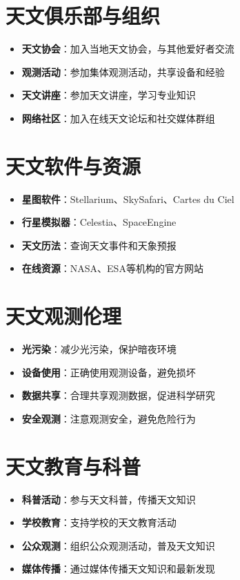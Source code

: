 \documentclass[12pt,UTF8]{ctexbook}
\begin{document}
\section{天文俱乐部与组织}

\begin{itemize}
  \item \textbf{天文协会}：加入当地天文协会，与其他爱好者交流
  \item \textbf{观测活动}：参加集体观测活动，共享设备和经验
  \item \textbf{天文讲座}：参加天文讲座，学习专业知识
  \item \textbf{网络社区}：加入在线天文论坛和社交媒体群组
\end{itemize}

\section{天文软件与资源}

\begin{itemize}
  \item \textbf{星图软件}：Stellarium、SkySafari、Cartes du Ciel
  \item \textbf{行星模拟器}：Celestia、SpaceEngine
  \item \textbf{天文历法}：查询天文事件和天象预报
  \item \textbf{在线资源}：NASA、ESA等机构的官方网站
\end{itemize}

\section{天文观测伦理}

\begin{itemize}
  \item \textbf{光污染}：减少光污染，保护暗夜环境
  \item \textbf{设备使用}：正确使用观测设备，避免损坏
  \item \textbf{数据共享}：合理共享观测数据，促进科学研究
  \item \textbf{安全观测}：注意观测安全，避免危险行为
\end{itemize}

\section{天文教育与科普}

\begin{itemize}
  \item \textbf{科普活动}：参与天文科普，传播天文知识
  \item \textbf{学校教育}：支持学校的天文教育活动
  \item \textbf{公众观测}：组织公众观测活动，普及天文知识
  \item \textbf{媒体传播}：通过媒体传播天文知识和最新发现
\end{itemize}
\end{document}
